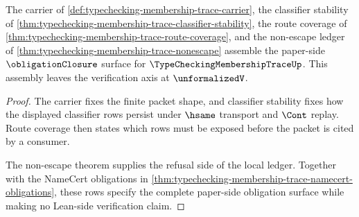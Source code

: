 \begin{theorem}
\label{thm:typechecking-membership-trace-obligation-assembly}
The carrier of \autoref{def:typechecking-membership-trace-carrier}, the classifier stability of \autoref{thm:typechecking-membership-trace-classifier-stability}, the route coverage of \autoref{thm:typechecking-membership-trace-route-coverage}, and the non-escape ledger of \autoref{thm:typechecking-membership-trace-nonescape} assemble the paper-side $\obligationClosure$ surface for $\TypeCheckingMembershipTraceUp$. This assembly leaves the verification axis at $\unformalizedV$.
\end{theorem}
\begin{proof}
The carrier fixes the finite packet shape, and classifier stability fixes how the displayed classifier rows persist under $\hsame$ transport and $\Cont$ replay. Route coverage then states which rows must be exposed before the packet is cited by a consumer.

The non-escape theorem supplies the refusal side of the local ledger. Together with the NameCert obligations in \autoref{thm:typechecking-membership-trace-namecert-obligations}, these rows specify the complete paper-side obligation surface while making no Lean-side verification claim.
\end{proof}

